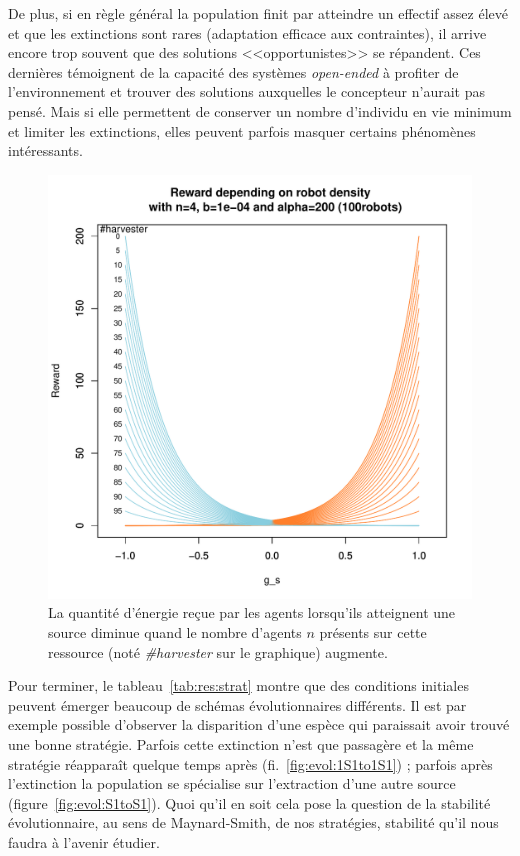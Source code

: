 \documentclass[a4paper,10pt]{report}
\begin{document}
	De plus, si en règle général la population finit par atteindre un effectif assez élevé et que les extinctions sont rares (adaptation efficace aux contraintes), il arrive encore trop souvent que des solutions <<opportunistes>> se répandent. Ces dernières témoignent de la capacité des systèmes \emph{open-ended} à profiter de l'environnement et trouver des solutions auxquelles le concepteur n'aurait pas pensé. Mais si elle permettent de conserver un nombre d'individu en vie minimum et limiter les extinctions, elles peuvent parfois masquer certains phénomènes intéressants.
	
	
	\begin{figure}[H]
	\centering
	\includegraphics[width=.6\textwidth]{images/densite}
	\caption[Pénalisation par la densité]{La quantité d'énergie reçue par les agents lorsqu'ils atteignent une source diminue quand le nombre d'agents $n$ présents sur cette ressource (noté \emph{\#harvester} sur le graphique) augmente.}
	\label{fig:densite}
	\end{figure}
	
	Pour terminer, le tableau~\ref{tab:res:strat} montre que des conditions initiales peuvent émerger beaucoup de schémas évolutionnaires différents. Il est par exemple possible d'observer la disparition d'une espèce qui paraissait avoir trouvé une bonne stratégie. Parfois cette extinction n'est que passagère et la même stratégie réapparaît quelque temps après (fi.~\ref{fig:evol:1S1to1S1}) ; parfois après l'extinction la population se spécialise sur l'extraction d'une autre source (figure~\ref{fig:evol:S1toS1}). Quoi qu'il en soit cela pose la question de la stabilité évolutionnaire, au sens de Maynard-Smith, de nos stratégies, stabilité qu'il nous faudra à l'avenir étudier.
	
\end{document}

